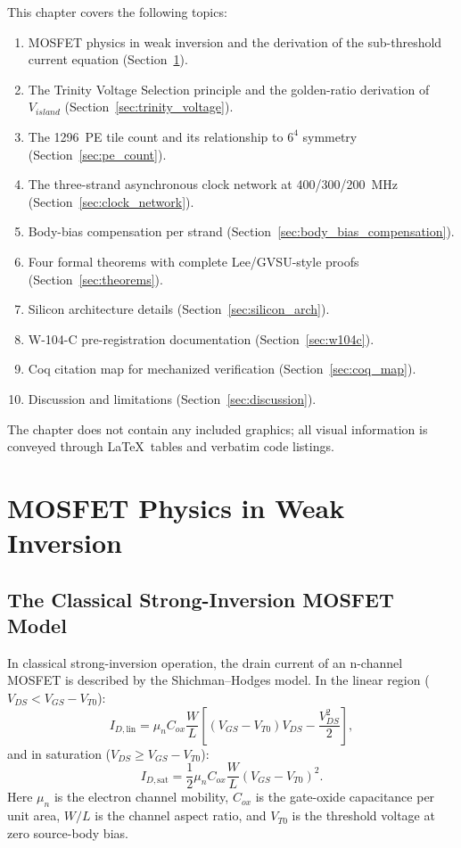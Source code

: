 This chapter covers the following topics:
\begin{enumerate}
  \item MOSFET physics in weak inversion and the derivation of the sub-threshold current
        equation (Section~\ref{sec:mosfet_physics}).
  \item The Trinity Voltage Selection principle and the golden-ratio derivation of
        $V_{island}$ (Section~\ref{sec:trinity_voltage}).
  \item The 1296~PE tile count and its relationship to $6^4$ symmetry
        (Section~\ref{sec:pe_count}).
  \item The three-strand asynchronous clock network at 400/300/200~MHz
        (Section~\ref{sec:clock_network}).
  \item Body-bias compensation per strand (Section~\ref{sec:body_bias_compensation}).
  \item Four formal theorems with complete Lee/GVSU-style proofs
        (Section~\ref{sec:theorems}).
  \item Silicon architecture details (Section~\ref{sec:silicon_arch}).
  \item W-104-C pre-registration documentation (Section~\ref{sec:w104c}).
  \item Coq citation map for mechanized verification (Section~\ref{sec:coq_map}).
  \item Discussion and limitations (Section~\ref{sec:discussion}).
\end{enumerate}

The chapter does not contain any included graphics; all visual information is conveyed through
\LaTeX\ tables and verbatim code listings.

\section{MOSFET Physics in Weak Inversion}
\label{sec:mosfet_physics}

\subsection{The Classical Strong-Inversion MOSFET Model}

In classical strong-inversion operation, the drain current of an n-channel MOSFET is
described by the Shichman--Hodges model.  In the linear region
($V_{DS} < V_{GS} - V_{T0}$):
\[
  I_{D,\text{lin}} = \mu_n C_{ox} \frac{W}{L}
    \left[ (V_{GS} - V_{T0}) V_{DS} - \frac{V_{DS}^2}{2} \right],
\]
and in saturation ($V_{DS} \geq V_{GS} - V_{T0}$):
\[
  I_{D,\text{sat}} = \frac{1}{2} \mu_n C_{ox} \frac{W}{L}
    (V_{GS} - V_{T0})^2.
\]
Here $\mu_n$ is the electron channel mobility, $C_{ox}$ is the gate-oxide capacitance per
unit area, $W/L$ is the channel aspect ratio, and $V_{T0}$ is the threshold voltage at zero
source-body bias.

